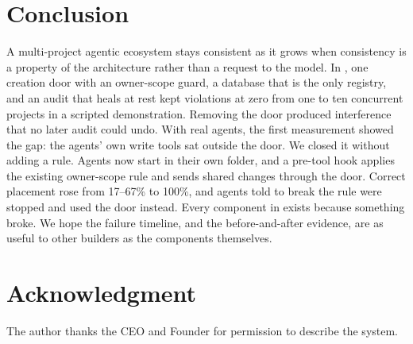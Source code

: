 \section{Conclusion}\label{sec:conclusion}
A multi-project agentic ecosystem stays consistent as it grows when consistency is a property of the architecture rather than a request to the model. In \sys{}, one creation door with an owner-scope guard, a database that is the only registry, and an audit that heals at rest kept violations at zero from one to ten concurrent projects in a scripted demonstration. Removing the door produced interference that no later audit could undo. With real agents, the first measurement showed the gap: the agents' own write tools sat outside the door. We closed it without adding a rule. Agents now start in their own folder, and a pre-tool hook applies the existing owner-scope rule and sends shared changes through the door. Correct placement rose from 17--67\% to 100\%, and agents told to break the rule were stopped and used the door instead. Every component in \sys{} exists because something broke. We hope the failure timeline, and the before-and-after evidence, are as useful to other builders as the components themselves.
\ifanon\else
\section*{Acknowledgment}
The author thanks the CEO and Founder for permission to describe the system.
\fi
